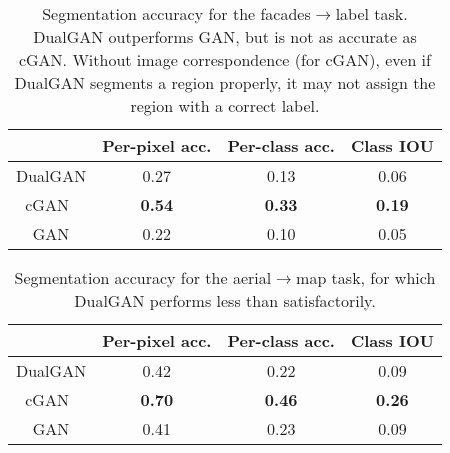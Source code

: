 \tabcolsep=0.11cm
\begin{table}
\begin{center}
\begin{tabular}{|c|c|c|c|}
\hline
  & Per-pixel acc.  & Per-class acc. & Class IOU\\
\hline\hline
DualGAN &  0.27 &  0.13 & 0.06\\      
\hline
cGAN~\cite{isola2016image}  &  \textbf{0.54}&  \textbf{0.33} &\textbf{0.19}\\  
\hline
GAN &   0.22&   0.10 & 0.05 \\
\hline
\end{tabular}
\caption{Segmentation accuracy for the facades$\rightarrow$label task. DualGAN outperforms GAN, but is not as accurate as cGAN. 
Without image correspondence (for cGAN), even if DualGAN segments a region properly, it may not assign the region with a 
correct label.} \label{table:acc}
\end{center}
\end{table}


\tabcolsep=0.11cm
\begin{table}
\begin{center}
\begin{tabular}{|c|c|c|c|}
\hline
  & Per-pixel acc.  & Per-class acc. & Class IOU\\
\hline\hline
DualGAN &  0.42 &  0.22 & 0.09\\      
\hline
cGAN~\cite{isola2016image}  &  \textbf{0.70}&  \textbf{0.46} &\textbf{0.26}\\  
\hline
GAN &   0.41&   0.23 & 0.09 \\
\hline
\end{tabular}
\caption{Segmentation accuracy for the aerial$\rightarrow$map task, for which DualGAN performs less than 
satisfactorily.} \label{table:acc_maps}
\end{center}
\end{table}



